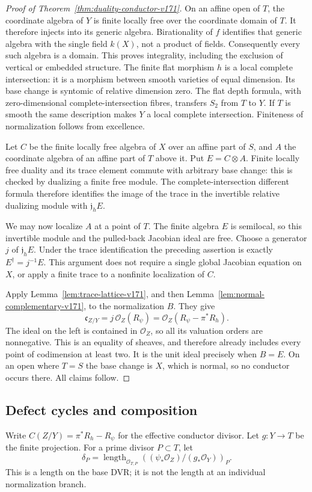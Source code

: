 \documentclass[11pt,reqno]{amsart}
\numberwithin{equation}{section}
\theoremstyle{definition}\newtheorem{definition}[theorem]{Definition}
\theoremstyle{remark}\newtheorem{remark}[theorem]{Remark}
\newcommand{\OO}{\mathcal O}\newcommand{\II}{\mathcal I}
\begin{document}
\begin{proof}[Proof of Theorem~\ref{thm:duality-conductor-v171}]
On an affine open of $T$, the coordinate algebra of $Y$ is finite
locally free over the coordinate domain of $T$. It therefore injects
into its generic algebra. Birationality of $f$ identifies that generic
algebra with the single field $k(X)$, not a product of fields.
Consequently every such algebra is a domain. This proves integrality,
including the exclusion of vertical or embedded structure. The finite
flat morphism $h$ is a local complete intersection: it is a morphism
between smooth varieties of equal dimension. Its base change is
syntomic of relative dimension zero. The flat depth formula, with
zero-dimensional complete-intersection fibres, transfers $S_2$ from
$T$ to $Y$. If $T$ is smooth the same description makes $Y$ a local
complete intersection. Finiteness of normalization follows from
excellence.

Let $C$ be the finite locally free algebra of $X$ over an affine part
of $S$, and $A$ the coordinate algebra of an affine part of $T$ above
it. Put $E=C\otimes A$. Finite locally free duality and its trace
element commute with arbitrary base change: this is checked by
dualizing a finite free module. The complete-intersection different
formula therefore identifies the image of the trace in the invertible
relative dualizing module with $\mathfrak j_hE$.

We may now localize $A$ at a point of $T$. The finite algebra $E$ is
semilocal, so this invertible module and the pulled-back Jacobian
ideal are free. Choose a generator $j$ of $\mathfrak j_hE$.
Under the trace identification the preceding assertion is exactly
$E^\dagger=j^{-1}E$. This argument does not require a single global
Jacobian equation on $X$, or apply a finite trace to a nonfinite
localization of $C$.

Apply Lemma~\ref{lem:trace-lattice-v171}, and then
Lemma~\ref{lem:normal-complementary-v171}, to the normalization $B$.
They give
\[
 \mathfrak c_{Z/Y}=j\,\OO_Z(R_\psi)
                 =\OO_Z(R_\psi-\pi^*R_h).
\]
The ideal on the left is contained in $\OO_Z$, so all its valuation
orders are nonnegative. This is an equality of sheaves, and therefore
already includes every point of codimension at least two.
It is the unit ideal precisely when $B=E$. On an open where $T=S$
the base change is $X$, which is normal, so no conductor occurs there.
All claims follow.
\end{proof}

\subsection{Defect cycles and composition}
Write $C(Z/Y)=\pi^*R_h-R_\psi$ for the effective conductor divisor.
Let $g:Y\to T$ be the finite projection. For a prime divisor
$P\subset T$, let
\[
 \delta_P=\operatorname{length}_{\OO_{T,P}}
   \left((\psi_*\OO_Z)/(g_*\OO_Y)\right)_P.
\]
This is a length on the base DVR; it is not the length at an individual
normalization branch.
\end{document}
